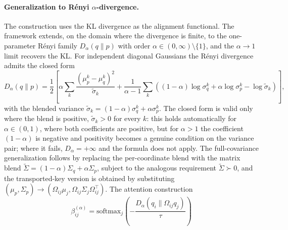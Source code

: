 \documentclass[11pt]{article}
\begin{document}
\paragraph{Generalization to R\'enyi $\alpha$-divergence.}
The construction uses the KL divergence as the alignment functional. The framework extends, on the domain where the divergence is finite, to the one-parameter R\'enyi family $D_\alpha(q \| p)$ with order $\alpha \in (0, \infty) \setminus \{1\}$, and the $\alpha \to 1$ limit recovers the KL. For independent diagonal Gaussians the R\'enyi divergence admits the closed form
\begin{equation}
D_\alpha(q \| p) = \frac{1}{2}\left[ \alpha \sum_k \frac{(\mu_p^k - \mu_q^k)^2}{\tilde\sigma_k} + \frac{1}{\alpha - 1} \sum_k \left((1-\alpha)\log \sigma_q^k + \alpha \log \sigma_p^k - \log \tilde\sigma_k\right) \right],
\label{eq:renyi_diagonal_itfb}
\end{equation}
with the blended variance $\tilde\sigma_k = (1-\alpha)\sigma_q^k + \alpha\sigma_p^k$. The closed form is valid only where the blend is positive, $\tilde\sigma_k > 0$ for every $k$: this holds automatically for $\alpha \in (0,1)$, where both coefficients are positive, but for $\alpha > 1$ the coefficient $(1-\alpha)$ is negative and positivity becomes a genuine condition on the variance pair; where it fails, $D_\alpha = +\infty$ and the formula does not apply. The full-covariance generalization follows by replacing the per-coordinate blend with the matrix blend $\tilde\Sigma = (1-\alpha)\Sigma_q + \alpha \Sigma_p$, subject to the analogous requirement $\tilde\Sigma \succ 0$, and the transported-key version is obtained by substituting $(\mu_p, \Sigma_p) \to (\Omega_{ij}\mu_j, \Omega_{ij}\Sigma_j\Omega_{ij}^\top)$. The attention construction
\begin{equation}
\beta_{ij}^{(\alpha)} = \mathrm{softmax}_j\left(-\frac{D_\alpha(q_i \| \Omega_{ij} q_j)}{\tau}\right)
\label{eq:renyi_attention_itfb}
\end{equation}
\end{document}
